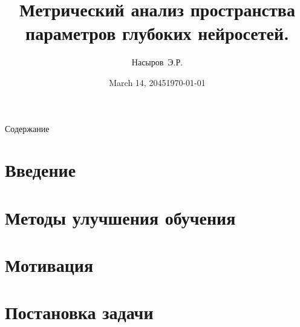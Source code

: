 \documentclass{beamer}
\title{Метрический анализ пространства параметров глубоких нейросетей.}
\author{Насыров~Э.Р.}
\date{March 14, 2045} %
\institute{МФТИ}
\date{\today}
\begin{document}
\frame{\titlepage}

\begin{frame}{Содержание}
    \begin{tableofcontents}
        \section{Введение}
        \section{Методы улучшения обучения}
        \section{Мотивация}
        \section{Постановка задачи}

\end{tableofcontents}
\end{frame}
\end{document}
